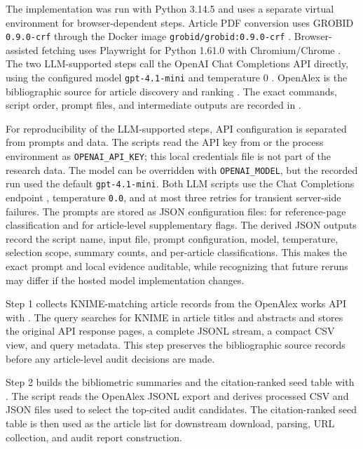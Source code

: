 \documentclass[runningheads]{llncs}
\begin{document}
The implementation was run with Python 3.14.5 and uses a separate
 virtual environment for browser-dependent steps.
Article PDF conversion uses GROBID \texttt{0.9.0-crf} through the Docker image
\texttt{grobid/grobid:0.9.0-crf} \cite{GROBIDSoftware2026}. Browser-assisted
fetching uses Playwright for Python 1.61.0 with Chromium/Chrome
\cite{PlaywrightPython2026}. The two LLM-supported steps call the OpenAI Chat
Completions API directly, using the configured model
\texttt{gpt-4.1-mini} and temperature 0 \cite{OpenAIAPI2026}. OpenAlex is the
bibliographic source for article discovery and ranking
\cite{Priem2022OpenAlex}. The exact commands, script order, prompt files, and
intermediate outputs are recorded in .

For reproducibility of the LLM-supported steps, API configuration is separated
from prompts and data. The scripts read the API key from  or the
process environment as \texttt{OPENAI\_API\_KEY}; this local credentials file
is not part of the research data. The model can be overridden with
\texttt{OPENAI\_MODEL}, but the recorded run used the default
\texttt{gpt-4.1-mini}. Both LLM scripts use the Chat Completions endpoint
, temperature \texttt{0.0},
and at most three retries for transient server-side failures. The prompts are
stored as JSON configuration files:
 for
reference-page classification and
 for
article-level supplementary flags. The derived JSON outputs record the script
name, input file, prompt configuration, model, temperature, selection scope,
summary counts, and per-article classifications. This makes the exact prompt
and local evidence auditable, while recognizing that future reruns may differ
if the hosted model implementation changes.

Step 1 collects KNIME-matching article records from the OpenAlex works API with
. The query searches for KNIME in
article titles and abstracts and stores the original API response pages, a
complete JSONL stream, a compact CSV view, and query metadata. This step
preserves the bibliographic source records before any article-level audit
decisions are made.

Step 2 builds the bibliometric summaries and the citation-ranked seed table
with . The script reads the
OpenAlex JSONL export and derives processed CSV and JSON files used to select
the top-cited audit candidates. The citation-ranked seed table is then used as
the article list for downstream download, parsing, URL collection, and audit
report construction.
\end{document}
